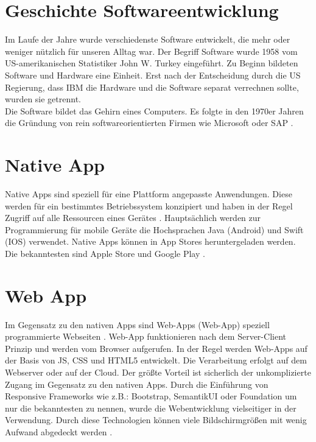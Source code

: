 \newpage
\section{Geschichte Softwareentwicklung}
Im Laufe der Jahre wurde verschiedenste Software entwickelt, die mehr oder weniger nützlich für unseren Alltag war.
Der Begriff Software wurde 1958 vom US-amerikanischen Statistiker John W. Turkey eingeführt.
Zu Beginn bildeten Software und Hardware eine Einheit. Erst nach der Entscheidung durch die US Regierung, dass IBM die Hardware und die Software separat verrechnen sollte, wurden sie getrennt. \\
Die Software bildet das Gehirn eines Computers.
Es folgte in den 1970er Jahren die Gründung von rein softwareorientierten Firmen wie Microsoft oder SAP \cite{Microsoft} \cite{SAP}. 

\section{Native App}\label{chap:Native Apps}
Native Apps sind speziell für eine Plattform angepasste Anwendungen. 
Diese werden für ein bestimmtes Betriebssystem konzipiert und haben in der Regel Zugriff auf alle Ressourcen eines Gerätes .
Hauptsächlich werden zur Programmierung für mobile Geräte die Hochsprachen Java (Android) und Swift (IOS) verwendet. Native Apps können in App Stores heruntergeladen  werden. \\Die bekanntesten sind Apple Store und Google Play \cite{NativeApp} \cite{Hochsprachen}.

\section{Web App}\label{chap:Webapplikationen}
Im Gegensatz zu den nativen Apps sind \acl{Web-App}s (\acs{Web-App}) speziell programmierte Webseiten .
\acs{Web-App} funktionieren nach dem Server-Client Prinzip und werden vom Browser aufgerufen. In der Regel werden \acs{Web-App}s auf der Basis von \acs{JS}, \acs{CSS} und \acs{HTML}5 entwickelt. Die Verarbeitung erfolgt auf dem Webserver oder auf der Cloud. 
Der größte Vorteil ist sicherlich der unkomplizierte Zugang im Gegensatz zu den nativen Apps.
Durch die Einführung von Responsive Frameworks wie z.B.: Bootstrap, SemantikUI oder Foundation um nur die bekanntesten zu nennen, wurde die Webentwicklung vielseitiger in der Verwendung. Durch diese Technologien können viele Bildschirmgrößen mit wenig Aufwand abgedeckt werden \cite{Hochsprachen} \cite{WebApps} \cite{CSS}. 

